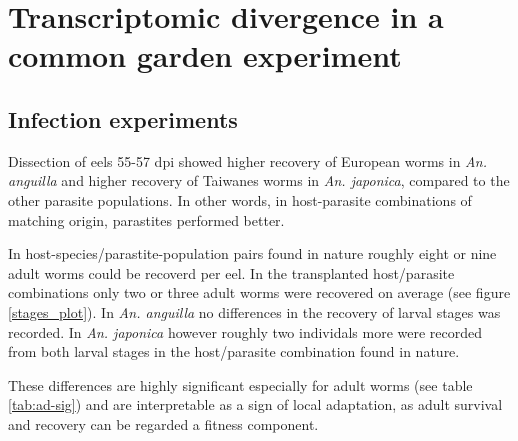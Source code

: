 
\chapter{Transcriptomic divergence in a common garden experiment}
\label{cha:tra-diff}


\ifpdf
    \graphicspath{{6_rna_seq/figures/PNG/}{6_rna_seq/figures/PDF/}{6_rna_seq/figures/}}
\else
    \graphicspath{{6_rna_seq/figures/EPS/}{6_rna_seq/figures/}}
\fi




\section{Infection experiments}

Dissection of eels 55-57 dpi showed higher recovery of European worms
in \textit{An. anguilla} and higher recovery of Taiwanes worms in
\textit{An. japonica}, compared to the other parasite populations. In
other words, in host-parasite combinations of matching origin,
parastites performed better.


In host-species/parastite-population pairs found in nature roughly
eight or nine adult worms could be recoverd per eel. In the
transplanted host/parasite combinations only two or three adult worms
were recovered on average (see figure \ref{stages_plot}). In
\textit{An. anguilla} no differences in the recovery of larval stages
was recorded. In \textit{An. japonica} however roughly two individals
more were recorded from both larval stages in the host/parasite
combination found in nature.

These differences are highly significant especially for adult worms
(see table \ref{tab:ad-sig}) and are interpretable as a sign of local
adaptation, as adult survival and recovery can be regarded a fitness
component.

